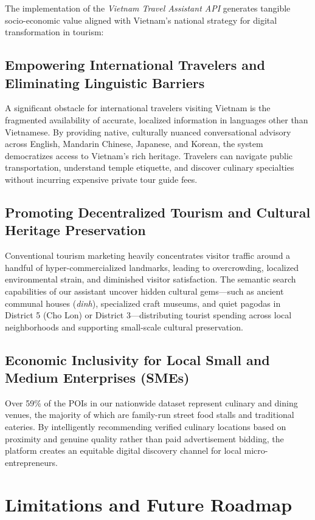 The implementation of the \textit{Vietnam Travel Assistant API} generates tangible socio-economic value aligned with Vietnam's national strategy for digital transformation in tourism:

\subsection{Empowering International Travelers and Eliminating Linguistic Barriers}
A significant obstacle for international travelers visiting Vietnam is the fragmented availability of accurate, localized information in languages other than Vietnamese. By providing native, culturally nuanced conversational advisory across English, Mandarin Chinese, Japanese, and Korean, the system democratizes access to Vietnam's rich heritage. Travelers can navigate public transportation, understand temple etiquette, and discover culinary specialties without incurring expensive private tour guide fees.

\subsection{Promoting Decentralized Tourism and Cultural Heritage Preservation}
Conventional tourism marketing heavily concentrates visitor traffic around a handful of hyper-commercialized landmarks, leading to overcrowding, localized environmental strain, and diminished visitor satisfaction. The semantic search capabilities of our assistant uncover hidden cultural gems—such as ancient communal houses (\textit{dinh}), specialized craft museums, and quiet pagodas in District 5 (Cho Lon) or District 3—distributing tourist spending across local neighborhoods and supporting small-scale cultural preservation.

\subsection{Economic Inclusivity for Local Small and Medium Enterprises (SMEs)}
Over 59\% of the POIs in our nationwide dataset represent culinary and dining venues, the majority of which are family-run street food stalls and traditional eateries. By intelligently recommending verified culinary locations based on proximity and genuine quality rather than paid advertisement bidding, the platform creates an equitable digital discovery channel for local micro-entrepreneurs.

\section{Limitations and Future Roadmap}
\label{sec:future_improvements}

